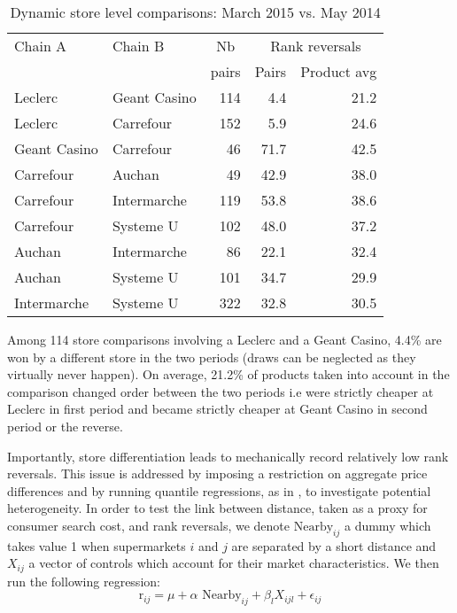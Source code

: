 \documentclass[english]{article}
\begin{document}
\begin{table}
\caption{Dynamic store level comparisons: March 2015 vs. May 2014}
\label{tab:dynamic_compa_15km}
\begin{threeparttable}
\begin{tabular}{llr|rr}
    \toprule
    \toprule
    Chain A & Chain B & \multicolumn{1}{c|}{Nb} & \multicolumn{2}{c}{Rank reversals} \\
          &       & \multicolumn{1}{c|}{pairs} & \multicolumn{1}{c}{Pairs} & \multicolumn{1}{c}{Product avg} \\
    \midrule
    Leclerc & Geant Casino & 114   & 4.4   & 21.2 \\
    Leclerc & Carrefour & 152   & 5.9   & 24.6 \\
    Geant Casino & Carrefour & 46    & 71.7  & 42.5 \\
    Carrefour & Auchan & 49    & 42.9  & 38.0 \\
    Carrefour & Intermarche & 119   & 53.8  & 38.6 \\
    Carrefour & Systeme U & 102   & 48.0  & 37.2 \\
    Auchan & Intermarche & 86    & 22.1  & 32.4 \\
    Auchan & Systeme U & 101   & 34.7  & 29.9 \\
    Intermarche & Systeme U & 322   & 32.8  & 30.5 \\
    \bottomrule
    \bottomrule
\end{tabular}
\begin{tablenotes}
      \small
      \item Among 114 store comparisons involving a Leclerc and a Geant Casino, 4.4\% are won by a different store in the two periods (draws can be neglected as they virtually never happen). On average, 21.2\% of products taken into account in the comparison changed order between the two periods i.e were strictly cheaper at Leclerc in first period and became strictly cheaper at Geant Casino in second period or the reverse.
\end{tablenotes}
\end{threeparttable}
\end{table}

Importantly, store differentiation leads to mechanically record relatively low rank reversals. This issue is addressed by imposing a restriction on aggregate price differences and by running quantile regressions, as in \cite{TAP11}, to investigate potential heterogeneity. In order to test the link between distance, taken as a proxy for consumer search cost, and rank reversals, we denote $\text{Nearby}_{ij}$ a dummy which takes value 1 when supermarkets $i$ and $j$ are separated by a short distance and $X_{ij}$ a vector of controls which account for their market characteristics. We then run the following regression:
\begin{equation}
\text{r}_{ij}= \mu + \alpha {\text{ Nearby}_{ij}} + \beta_{l} X_{ijl} + \epsilon_{ij}
\end{equation}
\end{document}
